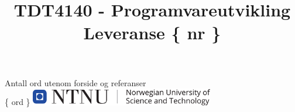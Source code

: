 \documentclass[a4paper, 12pt]{article}
\title{TDT4140 - Programvareutvikling\\Leveranse \{ nr \}}
\author{}
\date{}
\begin{document}
\maketitle
\begin{center}
Antall ord utenom forside og referanser
\\\{ ord \} 
\vfill
\includegraphics[width=8cm]{ntnu.pdf}
\end{center}
\thispagestyle{empty}
\addtocounter{page}{-1}
\newpage
\tableofcontents
\newpage



\newpage
\printbibliography[heading=bibintoc]
\end{document}
